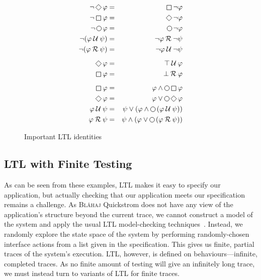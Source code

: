 \documentclass[sigplan,nonacm,10pt]{acmart}
\makeatletter
\newcommand{\Quickstrom}[0]{%
  \if@ACM@anonymous%
  \textsc{Bl\aa{}haj}%
  \else%
  Quickstrom%
  \fi\xspace}
\newcommand{\Next}{\operatorname{%
  \tikz[baseline]{
    \draw[line width=.12ex]
      (0,.6ex) circle (.8ex);
  }}}{}
\newcommand{\Eventually}{\operatorname{%
  \tikz[baseline]{
    \draw[line width=.12ex,line join=round]
      (0ex,.6ex) -- (.95ex,1.55ex) -- (1.9ex,.6ex) -- (.95ex,-.35ex) -- cycle;
  }}}{}
\newcommand{\Always}{\operatorname{%
  \tikz[baseline]{
    \draw[draw=white] (-0.2ex,0ex) -- (1.7ex,0ex);
    \draw[line width=.12ex,line join=round]
      (0ex,-.2ex) -- (0ex,1.3ex) -- (1.5ex,1.3ex) -- (1.5ex,.-.2ex) -- cycle;
  }}}{}
\newcommand{\Until}{\mathbin{%
  \mathcal{U}}}{}
\newcommand{\Release}{\mathbin{%
  \mathcal{R}}}{}
\makeatother
\begin{document}
    \begin{figure}
      \begin{eqnarray}
      \neg \Eventually \varphi & = & \Always \neg \varphi  \\
      \neg \Always \varphi & = & \Eventually \neg \varphi  \\
      \neg \Next \varphi & = & \Next \neg \varphi  \\
      \neg (\varphi \Until \psi) & = & \neg \varphi \Release \neg \psi\\
      \neg (\varphi \Release \psi) & = & \neg \varphi \Until \neg \psi\\[0.5em]
      \Eventually \varphi & = & \top \Until \varphi \\
      \Always \varphi & = & \bot \Release \varphi \\[0.5em]
      \Always \varphi & = & \varphi \land \Next \Always \varphi \\
      \Eventually \varphi & = & \varphi \lor \Next \Eventually \varphi \\
      \varphi \Until \psi & = & \psi \lor (\varphi \land \Next\, (\varphi \Until \psi)) \\
      \varphi \Release \psi & = & \psi \land (\varphi \lor \Next\, (\varphi \Release \psi))
      \end{eqnarray}
      \caption{Important LTL identities}
      \label{fig:identities}
      \end{figure}
\subsection{LTL with Finite Testing}
As can be seen from these examples, LTL makes it easy to specify our application, but actually checking
that our application meets our specification remains a challenge. As \Quickstrom does not have any view of the
application's structure beyond the current trace, we cannot construct a model of the system and apply
the usual LTL model-checking techniques~\citep{ltlmc}. Instead, we randomly explore the state space of
the system by performing randomly-chosen interface actions from a list given in the specification. This gives us
finite, partial traces of the system's execution. LTL, however, is defined on behaviours---infinite, completed traces.
As no finite amount of testing will give an infinitely long trace, we must instead turn to variants of LTL for finite
traces.
\end{document}
